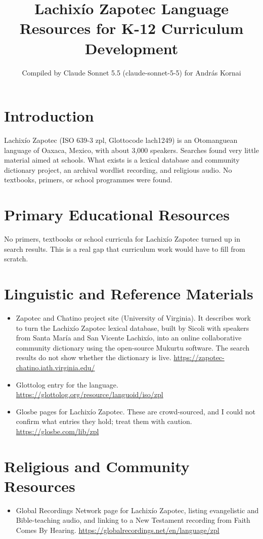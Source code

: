 \documentclass[12pt]{article}
\title{Lachix\'io Zapotec Language Resources for K-12 Curriculum Development}
\author{Compiled by Claude Sonnet 5.5 (claude-sonnet-5-5) for Andr\'as Kornai}
\date{}
\begin{document}
\maketitle

\section{Introduction}
Lachix\'io Zapotec (ISO 639-3 zpl, Glottocode lach1249) is an Otomanguean language of Oaxaca, Mexico, with about 3,000 speakers. Searches found very little material aimed at schools. What exists is a lexical database and community dictionary project, an archival wordlist recording, and religious audio. No textbooks, primers, or school programmes were found.

\section{Primary Educational Resources}
No primers, textbooks or school curricula for Lachix\'io Zapotec turned up in search results. This is a real gap that curriculum work would have to fill from scratch.

\section{Linguistic and Reference Materials}
\begin{itemize}
\item Zapotec and Chatino project site (University of Virginia). It describes work to turn the Lachix\'io Zapotec lexical database, built by Sicoli with speakers from Santa Mar\'ia and San Vicente Lachix\'io, into an online collaborative community dictionary using the open-source Mukurtu software. The search results do not show whether the dictionary is live. \url{https://zapotec-chatino.iath.virginia.edu/}
\item Glottolog entry for the language. \url{https://glottolog.org/resource/languoid/iso/zpl}
\item Glosbe pages for Lachix\'io Zapotec. These are crowd-sourced, and I could not confirm what entries they hold; treat them with caution. \url{https://glosbe.com/lib/zpl}
\end{itemize}

\section{Religious and Community Resources}
\begin{itemize}
\item Global Recordings Network page for Lachix\'io Zapotec, listing evangelistic and Bible-teaching audio, and linking to a New Testament recording from Faith Comes By Hearing. \url{https://globalrecordings.net/en/language/zpl}
\end{itemize}
\end{document}

